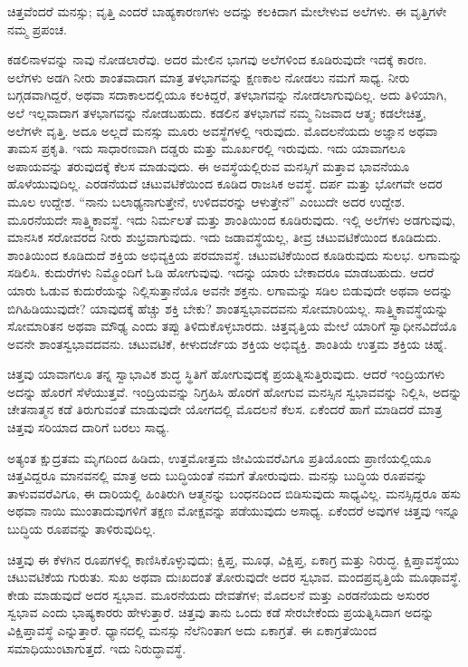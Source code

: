 ಚಿತ್ತವೆಂದರೆ ಮನಸ್ಸು; ವೃತ್ತಿ ಎಂದರೆ ಬಾಹ್ಯಕಾರಣಗಳು ಅದನ್ನು ಕಲಕಿದಾಗ ಮೇಲೇಳುವ ಅಲೆಗಳು. ಈ ವೃತ್ತಿಗಳೇ ನಮ್ಮ ಪ್ರಪಂಚ. 

ಕಡಲಿನಾಳವನ್ನು ನಾವು ನೋಡಲಾರೆವು. ಅದರ ಮೇಲಿನ ಭಾಗವು ಅಲೆಗಳಿಂದ ಕೂಡಿರುವುದೇ ಇದಕ್ಕೆ ಕಾರಣ. ಅಲೆಗಳು ಅಡಗಿ ನೀರು ಶಾಂತವಾದಾಗ ಮಾತ್ರ ತಳಭಾಗವನ್ನು ಕ್ಷಣಕಾಲ ನೋಡಲು ನಮಗೆ ಸಾಧ್ಯ. ನೀರು ಬಗ್ಗಡವಾಗಿದ್ದರೆ, ಅಥವಾ ಸದಾಕಾಲದಲ್ಲಿಯೂ ಕಲಕಿದ್ದರೆ, ತಳಭಾಗವನ್ನು ನೋಡಲಾಗುವುದಿಲ್ಲ. ಅದು ತಿಳಿಯಾಗಿ, ಅಲೆ ಇಲ್ಲವಾದಾಗ ತಳಭಾಗವನ್ನು ನೋಡಬಹುದು. ಕಡಲಿನ ತಳಭಾಗವೆ ನಮ್ಮ ನಿಜವಾದ ಆತ್ಮ; ಕಡಲೇಚಿತ್ತ, ಅಲೆಗಳೇ ವೃತ್ತಿ. ಅದೂ ಅಲ್ಲದೆ ಮನಸ್ಸು ಮೂರು ಅವಸ್ಥೆಗಳಲ್ಲಿ ಇರುವುದು. ಮೊದಲನೆಯದು ಅಜ್ಞಾನ ಅಥವಾ ತಾಮಸ ಪ್ರಕೃತಿ. ಇದು ಸಾಧಾರಣವಾಗಿ ದಡ್ಡರು ಮತ್ತು ಮೂರ್ಖರಲ್ಲಿ ಇರುವುದು. ಇದು ಯಾವಾಗಲೂ ಅಪಾಯವನ್ನು ತರುವುದಕ್ಕೆ ಕೆಲಸ ಮಾಡುವುದು. ಈ ಅವಸ್ಥೆಯಲ್ಲಿರುವ ಮನಸ್ಸಿಗೆ ಮತ್ತಾವ ಭಾವನೆಯೂ ಹೊಳೆಯುವುದಿಲ್ಲ. ಎರಡನೆಯದೆ ಚಟುವಟಿಕೆಯಿಂದ ಕೂಡಿದ ರಾಜಸಿಕ ಅವಸ್ಥೆ. ದರ್ಪ ಮತ್ತು ಭೋಗವೇ ಅದರ ಮೂಲ ಉದ್ದೇಶ. “ನಾನು ಬಲಾಢ್ಯನಾಗುತ್ತೇನೆ, ಉಳಿದವರನ್ನು ಆಳುತ್ತೇನೆ” ಎಂಬುದೇ ಅದರ ಉದ್ದೇಶ. ಮೂರನೆಯದೇ ಸಾತ್ತ್ವಿಕಾವಸ್ಥೆ. ಇದು ನಿರ್ಮಲತೆ ಮತ್ತು ಶಾಂತಿಯಿಂದ ಕೂಡಿರುವುದು. ಇಲ್ಲಿ ಅಲೆಗಳು ಅಡಗುವುವು, ಮಾನಸಿಕ ಸರೋವರದ ನೀರು ಶುಭ್ರವಾಗುವುದು. ಇದು ಜಡಾವಸ್ಥೆಯಲ್ಲ, ತೀವ್ರ ಚಟುವಟಿಕೆಯಿಂದ ಕೂಡಿದುದು. ಶಾಂತಿಯಿಂದ ಕೂಡಿದುದೆ ಶಕ್ತಿಯ ಅಭಿವ್ಯಕ್ತಿಯ ಪರಮಾವಸ್ಥೆ. ಚಟುವಟಿಕೆಯಿಂದ ಕೂಡಿರುವುದು ಸುಲಭ. ಲಗಾಮನ್ನು ಸಡಿಲಿಸಿ. ಕುದುರೆಗಳು ನಿಮ್ಮೊಂದಿಗೆ ಓಡಿ ಹೋಗುವುವು. ಇದನ್ನು ಯಾರು ಬೇಕಾದರೂ ಮಾಡಬಹುದು. ಆದರೆ ಯಾರು ಓಡುವ ಕುದುರೆಯನ್ನು ನಿಲ್ಲಿಸುತ್ತಾನೆಯೊ ಅವನೇ ಶಕ್ತನು. ಲಗಾಮನ್ನು ಸಡಿಲ ಬಿಡುವುದೇ ಅಥವಾ ಅದನ್ನು ಬಿಗಿಹಿಡಿಯುವುದೇ? ಯಾವುದಕ್ಕೆ ಹೆಚ್ಚು ಶಕ್ತಿ ಬೇಕು? ಶಾಂತಸ್ವಭಾವದವನು ಸೋಮಾರಿಯಲ್ಲ. ಸಾತ್ತ್ವಿಕಾವಸ್ಥೆಯನ್ನು ಸೋಮಾರಿತನ ಅಥವಾ ಮೌಢ್ಯ ಎಂದು ತಪ್ಪು ತಿಳಿದುಕೊಳ್ಳಬಾರದು. ಚಿತ್ತವೃತ್ತಿಯ ಮೇಲೆ ಯಾರಿಗೆ ಸ್ವಾಧೀನವಿದೆಯೊ ಅವನೇ ಶಾಂತಸ್ವಭಾವದವನು. ಚಟುವಟಿಕೆ, ಕೀಳುದರ್ಜೆಯ ಶಕ್ತಿಯ ಅಭಿವ್ಯಕ್ತಿ. ಶಾಂತಿಯೆ ಉತ್ತಮ ಶಕ್ತಿಯ ಚಿಹ್ನೆ. 

ಚಿತ್ತವು ಯಾವಾಗಲೂ ತನ್ನ ಸ್ವಾಭಾವಿಕ ಶುದ್ಧ ಸ್ಥಿತಿಗೆ ಹೋಗುವುದಕ್ಕೆ ಪ್ರಯತ್ನಿಸುತ್ತಿರುವುದು. ಆದರೆ ಇಂದ್ರಿಯಗಳು ಅದನ್ನು ಹೊರಗೆ ಸೆಳೆಯುತ್ತವೆ. ಇಂದ್ರಿಯವನ್ನು ನಿಗ್ರಹಿಸಿ ಹೊರಗೆ ಹೋಗುವ ಮನಸ್ಸಿನ ಸ್ವಭಾವವನ್ನು ನಿಲ್ಲಿಸಿ, ಅದನ್ನು ಚೇತನಾತ್ಮನ ಕಡೆ ತಿರುಗುವಂತೆ ಮಾಡುವುದೇ ಯೋಗದಲ್ಲಿ ಮೊದಲನೆ ಕೆಲಸ. ಏಕೆಂದರೆ ಹಾಗೆ ಮಾಡಿದರೆ ಮಾತ್ರ ಚಿತ್ತವು ಸರಿಯಾದ ದಾರಿಗೆ ಬರಲು ಸಾಧ್ಯ. 

ಅತ್ಯಂತ ಕ್ಷುದ್ರತಮ ಮೃಗದಿಂದ ಹಿಡಿದು, ಉತ್ತಮೋತ್ತಮ ಜೀವಿಯವರೆವಿಗೂ ಪ್ರತಿಯೊಂದು ಪ್ರಾಣಿಯಲ್ಲಿಯೂ ಚಿತ್ತವಿದ್ದರೂ ಮಾನವನಲ್ಲಿ ಮಾತ್ರ ಅದು ಬುದ್ಧಿಯಂತೆ ನಮಗೆ ತೋರುವುದು. ಮನಸ್ಸು ಬುದ್ಧಿಯ ರೂಪವನ್ನು ತಾಳುವವರೆವಿಗೂ, ಈ ದಾರಿಯಲ್ಲಿ ಹಿಂತಿರುಗಿ ಆತ್ಮನನ್ನು ಬಂಧನದಿಂದ ಬಿಡಿಸುವುದು ಸಾಧ್ಯವಿಲ್ಲ. ಮನಸ್ಸಿದ್ದರೂ ಹಸು ಅಥವಾ ನಾಯಿ ಮುಂತಾದುವುಗಳಿಗೆ ತಕ್ಷಣ ಮೋಕ್ಷವನ್ನು ಪಡೆಯುವುದು ಅಸಾಧ್ಯ. ಏಕೆಂದರೆ ಅವುಗಳ ಚಿತ್ತವು ಇನ್ನೂ ಬುದ್ಧಿಯ ರೂಪವನ್ನು ತಾಳಿರುವುದಿಲ್ಲ. 

\eject

ಚಿತ್ತವು ಈ ಕೆಳಗಿನ ರೂಪಗಳಲ್ಲಿ ಕಾಣಿಸಿಕೊಳ್ಳುವುದು; ಕ್ಷಿಪ್ತ, ಮೂಢ, ವಿಕ್ಷಿಪ್ತ, ಏಕಾಗ್ರ ಮತ್ತು ನಿರುದ್ಧ. ಕ್ಷಿಪ್ತಾವಸ್ಥೆಯು ಚಟುವಟಿಕೆಯ ಗುರುತು. ಸುಖ ಅಥವಾ ದುಃಖದಂತೆ ತೋರುವುದೇ ಅದರ ಸ್ವಭಾವ. ಮಂದಪ್ರವೃತ್ತಿಯೆ ಮೂಢಾವಸ್ಥೆ. ಕೇಡು ಮಾಡುವುದೆ ಅದರ ಸ್ವಭಾವ. ಮೂರನೆಯದು ದೇವತೆಗಳ; ಮೊದಲನೆ ಮತ್ತು ಎರಡನೆಯದು ಅಸುರರ ಸ್ವಭಾವ ಎಂದು ಭಾಷ್ಯಕಾರರು ಹೇಳುತ್ತಾರೆ. ಚಿತ್ತವು ತಾನು ಒಂದು ಕಡೆ ಸೇರಬೇಕೆಂದು ಪ್ರಯತ್ನಿಸಿದಾಗ ಅದನ್ನು ವಿಕ್ಷಿಪ್ತಾವಸ್ಥೆ ಎನ್ನುತ್ತಾರೆ. ಧ್ಯಾನದಲ್ಲಿ ಮನಸ್ಸು ನೆಲೆನಿಂತಾಗ ಅದು ಏಕಾಗ್ರತೆ. ಈ ಏಕಾಗ್ರತೆಯಿಂದ ಸಮಾಧಿಯುಂಟಾಗುತ್ತದೆ. ಇದು ನಿರುದ್ಧಾವಸ್ಥೆ. 

